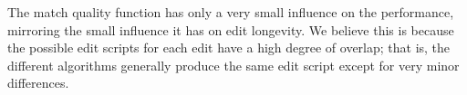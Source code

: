The match quality function has only a very small influence on
the performance, mirroring the small influence it has on edit longevity.
We believe this is because the possible edit scripts for
each edit have a high degree of overlap; that is,
the different algorithms generally produce the same edit script
except for very minor differences.


